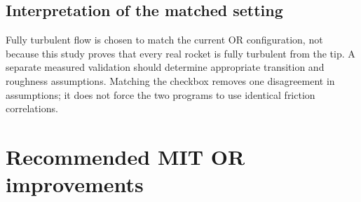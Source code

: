 \documentclass[oneside,openany]{amsdtx}
\begin{document}
\subsection{Interpretation of the matched setting}

Fully turbulent flow is chosen to match the current OR configuration, not because this study proves that every real rocket is fully turbulent from the tip. A separate measured validation should determine appropriate transition and roughness assumptions. Matching the checkbox removes one disagreement in assumptions; it does not force the two programs to use identical friction correlations.


\clearpage\section{Recommended MIT OR improvements}
\end{document}
